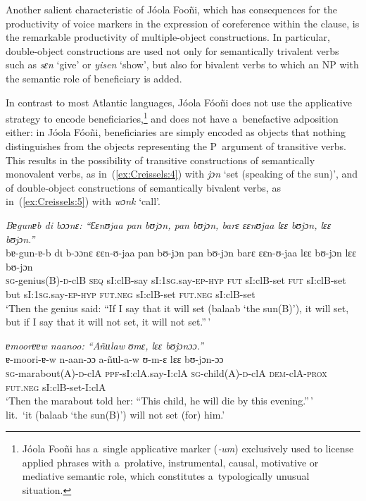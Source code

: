 \documentclass[output=paper]{langscibook}
\begin{document}
Another salient characteristic of Jóola Fooñi, which has consequences for the
productivity of voice markers in the expression of coreference within the
clause, is the remarkable productivity of multiple-object constructions.  In
particular, double-object constructions are used not only for semantically
trivalent verbs such as \textit{sɛn} `give' or \textit{yisen} `show', but also for
bivalent verbs to which an NP with the semantic role of beneficiary is added.

In contrast to most Atlantic languages, Jóola Fóoñi does not use the
applicative strategy to encode beneficiaries,\footnote{ Jóola Fooñi has
  a~single applicative marker (\textit{‑um}) exclusively used to license applied
  phrases with a~prolative, instrumental, causal, motivative or mediative
  semantic role, which constitutes a~typologically unusual situation. } and
does not have a~benefactive adposition either: in Jóola Fóoñi, beneficiaries
are simply encoded as objects that nothing distinguishes from the objects
representing the P~argument of transitive verbs.  This results in the
possibility of transitive constructions of semantically monovalent verbs, as
in~(\ref{ex:Creissels:4}) with \textit{jɔn} `set (speaking of the sun)', and of
double-object constructions of semantically bivalent verbs, as
in~(\ref{ex:Creissels:5}) with \textit{wɔnk} `call'.

\ea
  \label{ex:Creissels:4}
  
    \ea \label{ex:Creissels:4a}
    
      \textit{Bɐgunɐb di bɔɔnɛ: ``Ɛɛnʊjaa pan bʊjɔn, pan bʊjɔn, barɛ ɛɛnʊjaa lɛɛ bʊjɔn, lɛɛ bʊjɔn.''}\\
      \gll bɐ-gun-ɐ-b dɩ b-ɔɔnɛ ɛɛn-ʊ-jaa pan bʊ-jɔn pan bʊ-jɔn barɛ ɛɛn-ʊ-jaa lɛɛ bʊ-jɔn lɛɛ bʊ-jɔn\\
      \textsc{sg}-genius(B)-\textsc{d}-clB \textsc{seq} sI:clB-say sI:\textsc{1sg}.say-\textsc{ep-hyp} \textsc{fut} sI:clB-set \textsc{fut} sI:clB-set but sI:\textsc{1sg}.say-\textsc{ep-hyp} \textsc{fut.neg} sI:clB-set \textsc{fut.neg} sI:clB-set\\
      \glt `Then the genius said: ``If I say that it will set (balaab `the sun(B)'), it will set, but if I say that it will not set, it will not set.''\,'
    

    \ex\label{ex:Creissels:4b}
    \textit{ɐmoorɐɐw naanoo: ``Añɩɩlaw ʊmɛ, lɛɛ bʊjɔnɔɔ.''}\\
    \gll ɐ-moori-ɐ-w n-aan-ɔɔ a-ñɩɩl-a-w ʊ-m-ɛ lɛɛ bʊ-jɔn-ɔɔ\\
    \textsc{sg}-marabout(A)-\textsc{d}-clA \textsc{ppf}-sI:clA.say-I:clA
    \textsc{sg}-child(A)-\textsc{d}-clA \textsc{dem}-clA-\textsc{prox}
    \textsc{fut.neg} sI:clB-set-I:clA\\
    \glt `Then the marabout told her: ``This child, he will die by this evening.''\,' \\
    lit.\ `it (balaab `the sun(B)') will not set (for) him.'
  \z
 \z
 
\end{document}
